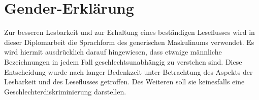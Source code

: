 
\chapter*{Gender-Erklärung}

Zur besseren Lesbarkeit und zur Erhaltung eines beständigen Leseflusses wird in dieser Diplomarbeit die Sprachform des generischen Maskulinums verwendet. Es wird hiermit ausdrücklich darauf hingewiesen, dass etwaige männliche Bezeichnungen in jedem Fall geschlechtsunabhängig zu verstehen sind. Diese Entscheidung wurde nach langer Bedenkzeit unter Betrachtung des Aspekts der Lesbarkeit und des Leseflusses getroffen. Des Weiteren soll sie keinesfalls eine Geschlechterdiskriminierung darstellen.